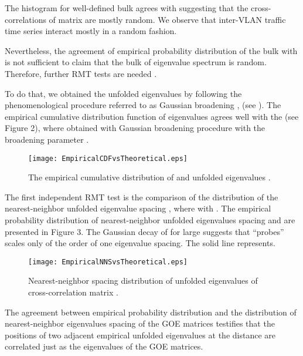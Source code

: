 \documentclass{IEEEtran}
\begin{document}
The histogram for well-defined bulk agrees with 
suggesting that the cross-correlations of matrix  are mostly random.
We observe that inter-VLAN traffic time series interact mostly in
a random fashion.

Nevertheless, the agreement of empirical probability distribution
 of the bulk with 
is not sufficient to claim that the bulk of eigenvalue spectrum is
random. Therefore, further RMT tests are needed \cite{Guhr1}.

To do that, we obtained the unfolded eigenvalues  by following
the phenomenological procedure referred to as Gaussian broadening
\cite{Bruus}, (see \cite{Bruus,Bruus2,Guhr1,Sharifi}). The empirical
cumulative distribution function of eigenvalues 
agrees well with the  (see Figure 2),
where  obtained with Gaussian broadening procedure with
the broadening parameter .\begin{figure}[h]
\begin{center}\texttt{[image: EmpiricalCDFvsTheoretical.eps]}\end{center}




\caption{\label{2}The empirical cumulative distribution of 
and unfolded eigenvalues . }
\end{figure}
The first independent RMT test is the comparison of the distribution
of the nearest-neighbor unfolded eigenvalue spacing ,
where  with  \cite{Mehta,Brody,Guhr3}.
The empirical probability distribution of nearest-neighbor unfolded
eigenvalues spacing  and 
are presented in Figure 3. The Gaussian decay of 
for large  suggests that  {}``probes''
scales only of the order of one eigenvalue spacing. The solid line
represents.\begin{figure}[h]
\begin{center}\texttt{[image: EmpiricalNNSvsTheoretical.eps]}\end{center}


\caption{\label{3} Nearest-neighbor spacing distribution 
of unfolded eigenvalues  of cross-correlation matrix . }
\end{figure}
The agreement between empirical probability distribution 
and the distribution of nearest-neighbor eigenvalues spacing of the
GOE matrices  testifies that the positions
of two adjacent empirical unfolded eigenvalues at the distance 
are correlated just as the eigenvalues of the GOE matrices.
\end{document}
